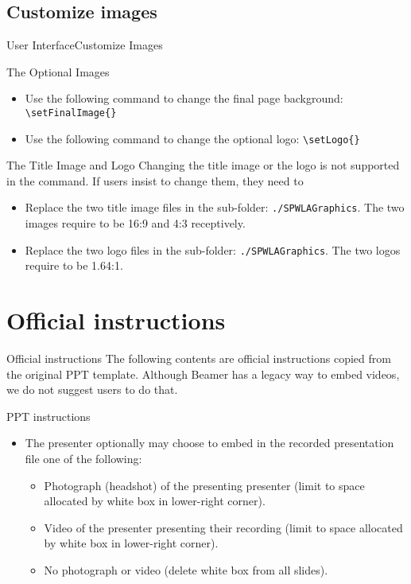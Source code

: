 \documentclass[10pt,xcolor={dvipsnames},aspectratio=169]{beamer}
\begin{document}
\subsection{Customize images}
\begin{frame}{User Interface}{Customize Images}
\small 
\begin{block}{The Optional Images}
  \begin{itemize}
    \item Use the following command to change the final page background:
    {\tt \textbackslash setFinalImage\{<path-to-the-file>\}}
    \item Use the following command to change the optional logo:
    {\tt \textbackslash setLogo\{<path-to-the-logo>\}}
  \end{itemize} 
\end{block}
\begin{block}{The Title Image and Logo}
  Changing the title image or the logo is not supported in the command. If users insist to change them, they need to
  \begin{itemize}
    \item Replace the two title image files in the sub-folder: \texttt{./SPWLAGraphics}. The two images require to be 16:9 and 4:3 receptively.
    \item Replace the two logo files in the sub-folder: \texttt{./SPWLAGraphics}. The two logos require to be 1.64:1.
  \end{itemize} 
\end{block}
\end{frame}


\section{Official instructions}
\begin{frame}{Official instructions}
The following contents are official instructions copied from the original PPT template. Although Beamer has a legacy way to embed videos, we do not suggest users to do that.
\begin{block}{PPT instructions}
  \begin{itemize}
    \item The presenter optionally may choose to embed in the recorded presentation file one of the following:  
    \begin{itemize}
      \item Photograph (headshot) of the presenting presenter (limit to space allocated by white box in lower-right corner).
      \item Video of the presenter presenting their recording (limit to space allocated by white box in lower-right corner).
      \item No photograph or video (delete white box from all slides).
    \end{itemize}
  \end{itemize}
\end{block}
\end{frame}
\end{document}
